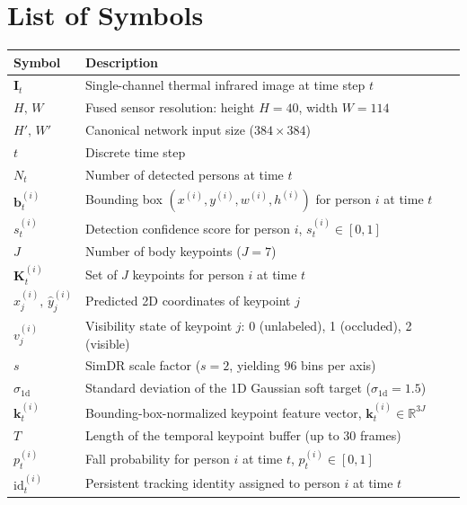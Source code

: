 \cleardoublepage
{}
{}
\chapter*{List of Symbols}

\renewcommand{\arraystretch}{1.8}
\begin{longtable}{@{}p{3.2cm}p{9.5cm}@{}}
\textbf{Symbol} & \textbf{Description} \\
\hline\endhead

$\mathbf{I}_t$        & Single-channel thermal infrared image at time step $t$ \\
$H,\,W$               & Fused sensor resolution: height $H=40$, width $W=114$ \\
$H',\,W'$             & Canonical network input size ($384\times384$) \\
$t$                   & Discrete time step \\
$N_t$                 & Number of detected persons at time $t$ \\
$\mathbf{b}_t^{(i)}$  & Bounding box $(x^{(i)},y^{(i)},w^{(i)},h^{(i)})$ for person $i$ at time $t$ \\
$s_t^{(i)}$           & Detection confidence score for person $i$, $s_t^{(i)}\in[0,1]$ \\
$J$                   & Number of body keypoints ($J=7$) \\
$\mathbf{K}_t^{(i)}$  & Set of $J$ keypoints for person $i$ at time $t$ \\
$\hat{x}_j^{(i)},\,\hat{y}_j^{(i)}$ & Predicted 2D coordinates of keypoint $j$ \\
$v_j^{(i)}$           & Visibility state of keypoint $j$: 0 (unlabeled), 1 (occluded), 2 (visible) \\
$s$                   & SimDR scale factor ($s=2$, yielding 96 bins per axis) \\
$\sigma_{1\text{d}}$  & Standard deviation of the 1D Gaussian soft target ($\sigma_{1\text{d}}=1.5$) \\
$\mathbf{k}_t^{(i)}$  & Bounding-box-normalized keypoint feature vector, $\mathbf{k}_t^{(i)}\in\mathbb{R}^{3J}$ \\
$T$                   & Length of the temporal keypoint buffer (up to 30 frames) \\
$p_t^{(i)}$           & Fall probability for person $i$ at time $t$, $p_t^{(i)}\in[0,1]$ \\
$\mathrm{id}_t^{(i)}$ & Persistent tracking identity assigned to person $i$ at time $t$ \\

\end{longtable}

